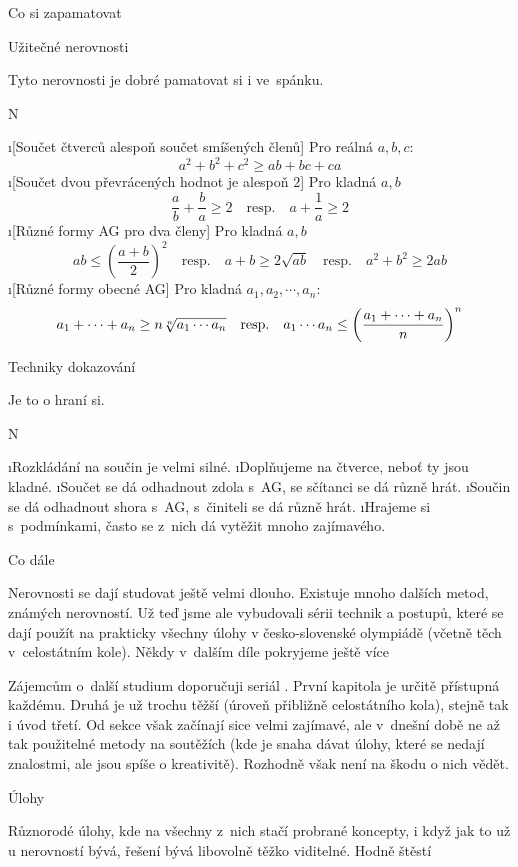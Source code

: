 \sec Co si zapamatovat

\secc Užitečné nerovnosti

Tyto nerovnosti je dobré pamatovat si i ve~spánku.

\begitems \style N

\i [Součet čtverců alespoň součet smíšených členů] Pro reálná $a,b,c$: 
$$
a^2+b^2+c^2 \ge ab+bc+ca
$$
\i [Součet dvou převrácených hodnot je alespoň $2$] Pro kladná $a,b$
$$
\frac ab + \frac ba \ge 2  \quad\text{resp.}\quad a + \frac 1a \ge 2
$$
\i [Různé formy AG pro dva členy] Pro kladná $a,b$
$$
ab \leq \left(\frac{a+b}{2}\right)^2 \quad\text{resp.}\quad
a+b \ge 2\sqrt{ab} \quad\text{resp.}\quad
a^2+b^2 \ge 2ab
$$
\i [Různé formy obecné AG] Pro kladná $a_1,a_2,\cdots,a_n$:
$$
a_1+\cdots+a_n \ge n \root n \of {a_1\cdots a_n}  \quad\text{resp.}\quad
a_1 \cdots a_n \leq \left(\frac{a_1+\cdots+a_n}{n}\right)^n
$$
\enditems 

\secc Techniky dokazování

Je to o hraní si.

\begitems \style N

\i Rozkládání na součin je velmi silné.
\i Doplňujeme na čtverce, neboť ty jsou kladné.
\i Součet se dá odhadnout zdola s~AG, se sčítanci se dá různě hrát.
\i Součin se dá odhadnout shora s~AG, s~činiteli se dá různě hrát.
\i Hrajeme si s~podmínkami, často se z~nich dá vytěžit mnoho zajímavého.

\enditems 

\sec Co dále

Nerovnosti se dají studovat ještě velmi dlouho. Existuje mnoho dalších metod, známých nerovností. Už teď jsme ale vybudovali sérii technik a postupů, které se dají použít na prakticky všechny úlohy v česko-slovenské olympiádě (včetně těch v~celostátním kole). Někdy v~dalším díle pokryjeme ještě více \SlightSmile{}

Zájemcům o~další studium doporučuji  seriál . První kapitola je určitě přístupná každému. Druhá je už trochu těžší (úroveň přibližně celostátního kola), stejně tak i úvod třetí. Od sekce  však začínají sice velmi zajímavé, ale v~dnešní době ne až tak použitelné metody na soutěžích (kde je snaha dávat úlohy, které se nedají  znalostmi, ale jsou spíše o kreativitě). Rozhodně však není na škodu o nich vědět.

\sec Úlohy

Různorodé úlohy, kde na všechny z~nich stačí probrané koncepty, i když jak to už u nerovností bývá, řešení bývá libovolně těžko viditelné. Hodně štěstí~\SlightSmile{}

